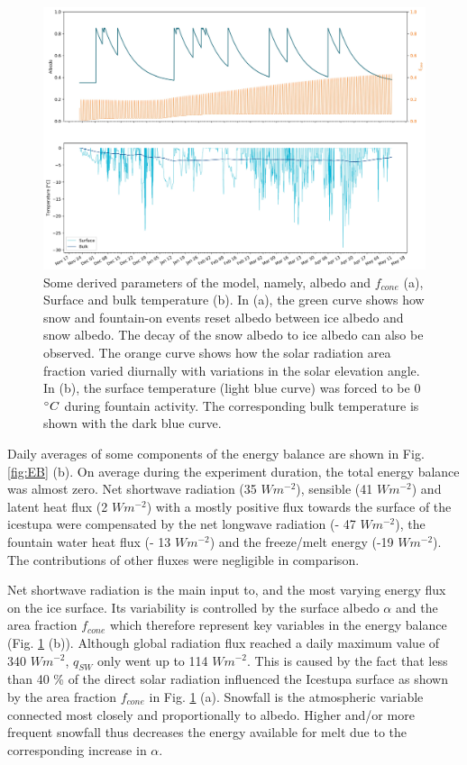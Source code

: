\documentclass[utf8]{frontiersSCNS} %
\begin{document}
\begin{figure} \begin{center} \includegraphics[width=15 cm]{Figures/albedo_temperature.jpg} \end{center} \caption{Some derived
  parameters of the model, namely, albedo and $f_{cone}$ (a), Surface and bulk temperature (b). In (a), the green curve
  shows how snow and fountain-on events reset albedo between ice albedo and snow albedo.  The decay of the snow albedo
  to ice albedo can also be observed. The orange curve shows how the solar radiation area fraction varied diurnally
  with variations in the solar elevation angle. In (b), the surface temperature (light blue curve) was forced to be 0
  $\degree C$ during fountain activity. The corresponding bulk temperature is shown with the dark blue curve.}
\label{fig:derived} \end{figure}
  

Daily averages of some components of the energy balance are shown in Fig.  \ref{fig:EB} (b). On average during the
experiment duration, the total energy balance was almost zero. Net shortwave radiation (35 $Wm^{-2}$), sensible (41
$Wm^{-2}$) and latent heat flux (2 $Wm^{-2}$) with a mostly positive flux towards the surface of the icestupa were
compensated by the net longwave radiation (- 47 $Wm^{-2}$), the fountain water heat flux (- 13 $Wm^{-2}$) and the
freeze/melt energy (-19 $Wm^{-2}$). The contributions of other fluxes were negligible in comparison.

Net shortwave radiation is the main input to, and the most varying energy flux on the ice surface. Its variability is
controlled by the surface albedo $\alpha$ and the area fraction $f_{cone}$ which therefore represent key variables in
the energy balance (Fig. \ref{fig:derived} (b)). Although global radiation flux reached a daily maximum value of 340
$Wm^{-2}$, $q_{SW}$ only went up to 114 $Wm^{-2}$. This is caused by the fact that less than 40 \% of the direct solar
radiation influenced the Icestupa surface as shown by the area fraction $f_{cone}$ in Fig. \ref{fig:derived} (a).
Snowfall is the atmospheric variable connected most closely and proportionally to albedo.  Higher and/or more frequent
snowfall thus decreases the energy available for melt due to the corresponding increase in $\alpha$. 
\end{document}

